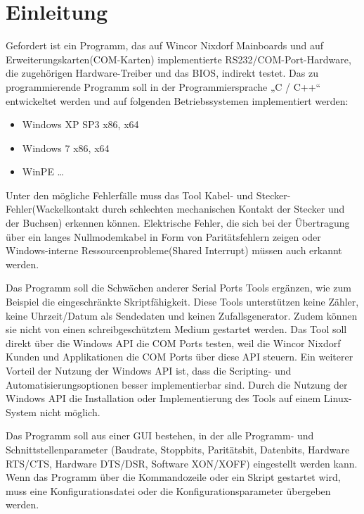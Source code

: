 \chapter{Einleitung}
Gefordert ist ein Programm, das auf Wincor Nixdorf Mainboards und auf Erweiterungskarten(COM-Karten) implementierte RS232/COM-Port-Hardware, die zugehörigen Hardware-Treiber und das BIOS, indirekt testet. Das zu programmierende Programm soll in der Programmiersprache „C / C++“ entwickeltet werden und auf folgenden Betriebssystemen implementiert werden:

\begin{itemize}
\item Windows XP SP3 x86, x64
\item Windows 7 x86, x64
\item  WinPE \ldots
\end{itemize}

Unter den mögliche Fehlerfälle muss das Tool Kabel- und Stecker-Fehler(Wackelkontakt durch schlechten mechanischen Kontakt der Stecker und der Buchsen) erkennen können.
Elektrische Fehler, die sich bei der Übertragung über ein langes Nullmodemkabel in Form von Paritätsfehlern zeigen oder Windows-interne Ressourcenprobleme(Shared Interrupt) müssen auch erkannt werden.

Das Programm soll die Schwächen anderer Serial Ports Tools ergänzen, wie zum Beispiel die eingeschränkte Skriptfähigkeit. Diese Tools unterstützen keine Zähler, keine Uhrzeit/Datum als Sendedaten und keinen Zufallsgenerator. Zudem können sie nicht von einen schreibgeschütztem Medium gestartet werden. Das Tool soll direkt über die Windows API die COM Ports testen, weil die Wincor Nixdorf Kunden und Applikationen die COM Ports über diese API steuern. Ein weiterer Vorteil der Nutzung der Windows API ist, dass die Scripting- und Automatisierungsoptionen besser implementierbar sind. Durch die Nutzung der Windows API die Installation oder Implementierung des Tools auf einem Linux-System nicht möglich.

Das Programm soll aus einer GUI bestehen, in der alle Programm- und Schnittstellenparameter (Baudrate, Stoppbits, Paritätsbit, Datenbits, Hardware RTS/CTS, Hardware DTS/DSR, Software XON/XOFF) eingestellt werden kann. Wenn das Programm über die Kommandozeile oder ein Skript gestartet wird, muss eine Konfigurationsdatei oder die Konfigurationsparameter übergeben werden.